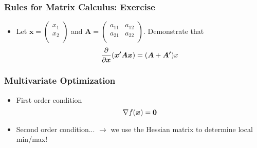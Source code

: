 \documentclass[pdflatex, 12pt]{beamer}
\begin{document}
\begin{frame}
\frametitle{Rules for Matrix Calculus: Exercise}
\begin{itemize}
\item Let $\bm{x} = \begin{pmatrix}
x_1 \\
x_2 \\
\end{pmatrix}$ and $\bm{A} = \begin{pmatrix}
a_{11} & a_{12} \\
a_{21} & a_{22} \\
\end{pmatrix}$. Demonstrate that
 \begin{equation}
 \frac{\partial}{\partial \bm{x}} (\bm{x'Ax}) = (\bm{A} + \bm{A'})x \notag
 \end{equation}
\end{itemize}
\end{frame}

\begin{frame}
\frametitle{Multivariate Optimization}
\begin{itemize}
\item First order condition
 \begin{equation}
 \nabla f(\bm{x}) = \bm{0} \notag
 \end{equation}
\vspace{0.2cm}
\item Second order condition... $\rightarrow$ we use the Hessian matrix to determine local min/max!
\end{itemize}
\end{frame}
\end{document}
